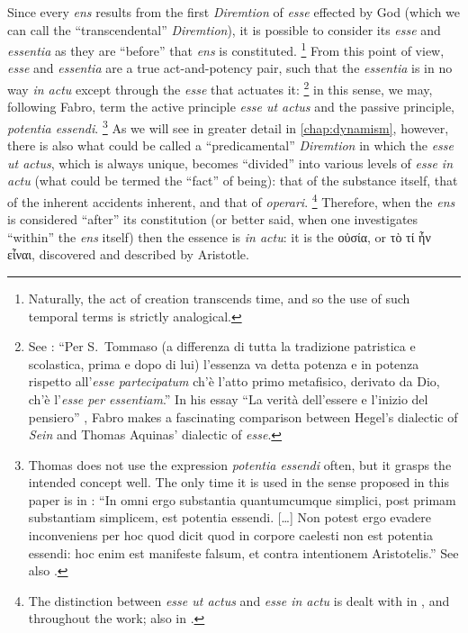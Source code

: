 Since every \emph{ens} results from the first \emph{Diremtion} of \emph{esse} effected by God (which we can call the “transcendental” \emph{Diremtion}), it is possible to consider its \emph{esse} and \emph{essentia} as they are “before” that \emph{ens} is constituted.%
%
\footnote{Naturally, the act of creation transcends time, and so the use of such temporal terms is strictly analogical.}
%
From this point of view, \emph{esse} and \emph{essentia} are a true act-and-potency pair, such that the \emph{essentia} is in no way \emph{in actu} except through the \emph{esse} that actuates it:%
%
\footnote{See \cite[40-41]{fabro:dallessere}: “Per S.~Tommaso (a differenza di tutta la tradizione patristica e scolastica, prima e dopo di lui) l’essenza va detta potenza e in potenza rispetto all’\emph{esse partecipatum} ch’è l’atto primo metafisico, derivato da Dio, ch’è l’\emph{esse per essentiam}.” In his essay “La verità dell’essere e l’inizio del pensiero” \parencite[11–69]{fabro:dallessere}, Fabro makes a fascinating comparison between Hegel’s dialectic of \emph{Sein} and Thomas Aquinas’ dialectic of \emph{esse}.}
%
in this sense, we may, following Fabro, term the active principle \emph{esse ut actus} and the passive principle, \emph{potentia essendi}.%
%
\footnote{Thomas does not use the expression \emph{potentia essendi} often, but it grasps the intended concept well. The only time it is used in the sense proposed in this paper is in \cite[VIII, lc.~21, n.~13]{st:phys}: “In omni ergo substantia quantumcumque simplici, post primam substantiam simplicem, est potentia essendi. [\ldots] Non potest ergo evadere inconveniens per hoc quod dicit quod in corpore caelesti non est potentia essendi: hoc enim est manifeste falsum, et contra intentionem Aristotelis.” See also \cite[30]{contat:esse-essentia-ordo}.}
%
As we will see in greater detail in \autoref{chap:dynamism}, however, there is also what could be called a “predicamental” \emph{Diremtion} in which the \emph{esse ut actus}, which is always unique, becomes “divided” into various levels of \emph{esse in actu} (what could be termed the “fact” of being): that of the substance itself, that of the inherent accidents inherent, and that of \emph{operari}.%
%
\footnote{The distinction between \emph{esse ut actus} and \emph{esse in actu} is dealt with in \cite[60–68]{fabro:partecipazione}, and throughout the work; also in \cite[117-125]{fabro:problematica}.}
%
Therefore, when the \emph{ens} is considered “after” its constitution (or better said, when one investigates “within” the \emph{ens} itself) then the essence is \emph{in actu}: it is the οὐσία, or τὸ τί ἦν εἶναι, discovered and described by Aristotle.

